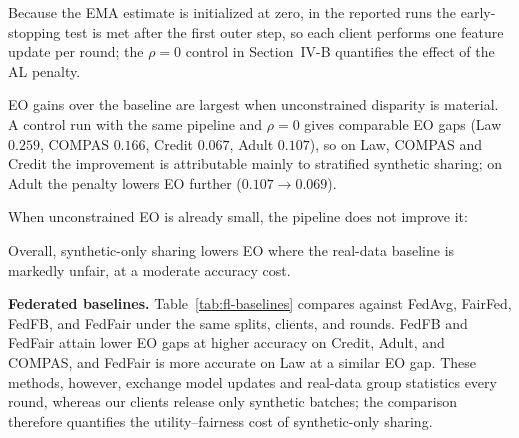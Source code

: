 Because the EMA estimate is initialized at zero, in the reported runs the early-stopping test is met after the first outer step, so each client performs one feature update per round; the $\rho{=}0$ control in Section~IV-B quantifies the effect of the AL penalty.

EO gains over the baseline are largest when unconstrained disparity is material. A control run with the same pipeline and $\rho=0$ gives comparable EO gaps (Law $0.259$, COMPAS $0.166$, Credit $0.067$, Adult $0.107$), so on Law, COMPAS and Credit the improvement is attributable mainly to stratified synthetic sharing; on Adult the penalty lowers EO further ($0.107 \to 0.069$).

When unconstrained EO is already small, the pipeline does not improve it:

Overall, synthetic-only sharing lowers EO where the real-data baseline is markedly unfair, at a moderate accuracy cost.

\textbf{Federated baselines.}
Table~\ref{tab:fl-baselines} compares against FedAvg, FairFed, FedFB, and FedFair under the same splits, clients, and rounds. FedFB and FedFair attain lower EO gaps at higher accuracy on Credit, Adult, and COMPAS, and FedFair is more accurate on Law at a similar EO gap. These methods, however, exchange model updates and real-data group statistics every round, whereas our clients release only synthetic batches; the comparison therefore quantifies the utility--fairness cost of synthetic-only sharing.

